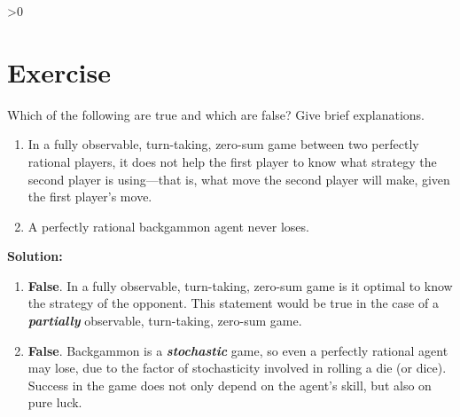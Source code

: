\documentclass{article}
\newcounter{partCounter}
\newcounter{ExerciseCounter}
\newenvironment{Exercise}[1][-1]{
	\ifnum#1>0
	\setcounter{ExerciseCounter}{#1}
	\fi
	\section{Exercise \arabic{ExerciseCounter}}
	\setcounter{partCounter}{1}
}{
}
\newcommand{\solution}{\textbf{\large Solution:}}
\begin{document}
    \newpage

    \begin{Exercise}[2]
     		Which of the following are true and which are false? Give brief explanations.
     		\begin{enumerate}
     			\item In a fully observable, turn-taking, zero-sum game between two perfectly rational players, it does not help the first player to know what strategy the second player is using—that is, what move the second player will make, given the first player’s move.
     			\item A perfectly rational backgammon agent never loses. \\
     		\end{enumerate}
     	
     	\solution \\
        \begin{enumerate}
            \item \textbf{False}. In a fully observable, turn-taking, zero-sum game is it optimal to know the strategy of the opponent. This statement would be true in the case of a \textbf{\textit{partially}} observable, turn-taking, zero-sum game.
            \item \textbf{False}. Backgammon is a \textbf{\textit{stochastic}} game, so even a perfectly rational agent may lose, due to the factor of stochasticity involved in rolling a die (or dice). Success in the game does not only depend on the agent's skill, but also on pure luck.
        \end{enumerate}
     	
    \end{Exercise}

    \newpage
\end{document}
